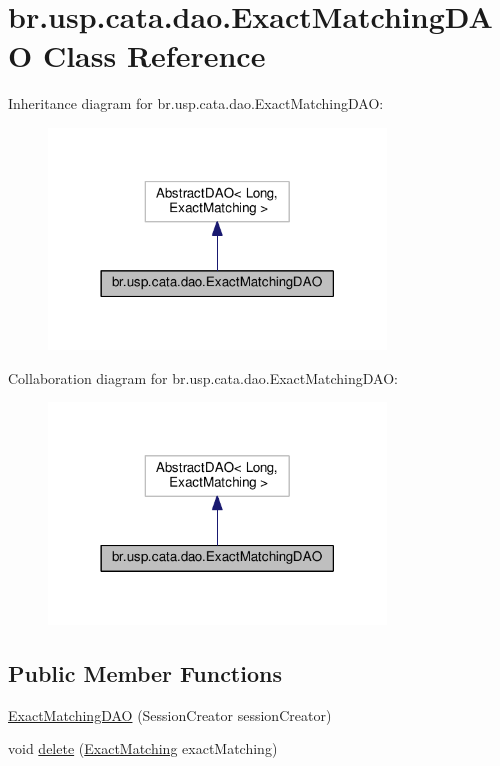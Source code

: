 \hypertarget{classbr_1_1usp_1_1cata_1_1dao_1_1_exact_matching_d_a_o}{\section{br.\+usp.\+cata.\+dao.\+Exact\+Matching\+D\+A\+O Class Reference}
\label{classbr_1_1usp_1_1cata_1_1dao_1_1_exact_matching_d_a_o}
}


Inheritance diagram for br.\+usp.\+cata.\+dao.\+Exact\+Matching\+D\+A\+O\+:\nopagebreak
\begin{figure}[H]
\begin{center}
\leavevmode
\includegraphics[width=254pt]{classbr_1_1usp_1_1cata_1_1dao_1_1_exact_matching_d_a_o__inherit__graph}
\end{center}
\end{figure}


Collaboration diagram for br.\+usp.\+cata.\+dao.\+Exact\+Matching\+D\+A\+O\+:\nopagebreak
\begin{figure}[H]
\begin{center}
\leavevmode
\includegraphics[width=254pt]{classbr_1_1usp_1_1cata_1_1dao_1_1_exact_matching_d_a_o__coll__graph}
\end{center}
\end{figure}
\subsection*{Public Member Functions}
\begin{DoxyCompactItemize}
\item 
\hyperlink{classbr_1_1usp_1_1cata_1_1dao_1_1_exact_matching_d_a_o_a90799f4bffedc88940f3ee7ebb89c34f}{Exact\+Matching\+D\+A\+O} (Session\+Creator session\+Creator)
\item 
void \hyperlink{classbr_1_1usp_1_1cata_1_1dao_1_1_exact_matching_d_a_o_a64901b8d4e26cfef2f3f2238661e9836}{delete} (\hyperlink{classbr_1_1usp_1_1cata_1_1model_1_1_exact_matching}{Exact\+Matching} exact\+Matching)
\end{DoxyCompactItemize}


